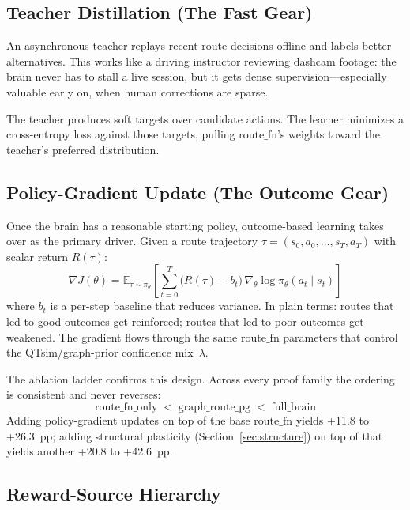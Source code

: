 \documentclass[11pt]{article}
\begin{document}
\subsection{Teacher Distillation (The Fast Gear)}
\label{sec:distillation}

An asynchronous teacher replays recent route decisions offline and labels better
alternatives. This works like a driving instructor reviewing dashcam footage:
the brain never has to stall a live session, but it gets dense
supervision---especially valuable early on, when human corrections are sparse.

The teacher produces soft targets over candidate actions. The learner minimizes
a cross-entropy loss against those targets, pulling $\mathrm{route\_fn}$'s
weights toward the teacher's preferred distribution.

\subsection{Policy-Gradient Update (The Outcome Gear)}
\label{sec:pg}

Once the brain has a reasonable starting policy, outcome-based learning takes
over as the primary driver. Given a route trajectory
$\tau=(s_0,a_0,\dots,s_T,a_T)$ with scalar return $R(\tau)$:
\[
\nabla J(\theta) = \mathbb{E}_{\tau\sim\pi_\theta}\!\left[\sum_{t=0}^{T}
  \bigl(R(\tau)-b_t\bigr)\,\nabla_\theta \log \pi_\theta(a_t\mid s_t)\right]
\]
where $b_t$ is a per-step baseline that reduces variance. In plain terms:
routes that led to good outcomes get reinforced; routes that led to poor
outcomes get weakened. The gradient flows through the same $\mathrm{route\_fn}$
parameters that control the QTsim/graph-prior confidence mix~$\lambda$.

The ablation ladder confirms this design. Across every proof family the
ordering is consistent and never reverses:
\[
\mathrm{route\_fn\_only} \;<\; \mathrm{graph\_route\_pg} \;<\;
\mathrm{full\_brain}
\]
Adding policy-gradient updates on top of the base $\mathrm{route\_fn}$ yields
+11.8 to +26.3~pp; adding structural plasticity (Section~\ref{sec:structure})
on top of that yields another +20.8 to +42.6~pp.

\subsection{Reward-Source Hierarchy}
\label{sec:reward}
\end{document}
